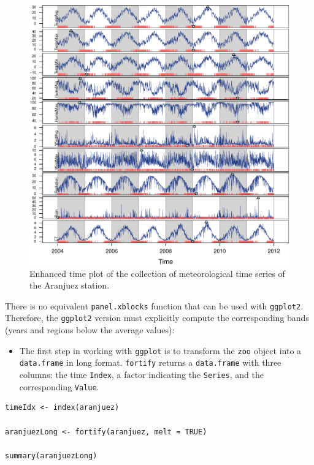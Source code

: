 \documentclass[smallroyalvopaper]{memoir}
\begin{document}
\begin{figure}[htbp]
\centering
\includegraphics[width=.9\linewidth]{figs/aranjuezXblocks.pdf}
\caption{Enhanced time plot of the collection of meteorological time series of the Aranjuez station. \label{fig:aranjuezEnhanced}}
\end{figure}

There is no equivalent \texttt{panel.xblocks} function that can be used with
\texttt{ggplot2}. Therefore, the \texttt{ggplot2} version must explicitly compute
the corresponding bands (years and regions below the average values):

\begin{itemize}
\item The first step in working with \texttt{ggplot} is to transform the \texttt{zoo}
object into a \texttt{data.frame} in long format. \texttt{fortify} returns a
\texttt{data.frame} with three columns: the time \texttt{Index}, a factor
indicating the \texttt{Series}, and the corresponding \texttt{Value}.
\end{itemize}


\lstset{language=r,label= ,caption= ,captionpos=b,numbers=none}
\begin{lstlisting}
timeIdx <- index(aranjuez)
  
aranjuezLong <- fortify(aranjuez, melt = TRUE)

summary(aranjuezLong)
\end{lstlisting}
\end{document}
